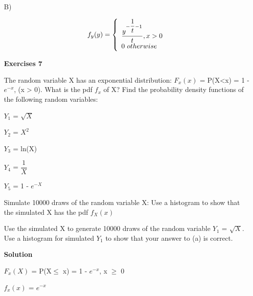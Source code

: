 \documentclass[12pt]{article}
\theoremstyle{definiton}
\theoremstyle{definition}
\theoremstyle{definition}
\let\leq\leqslant
\let\geq\geqslant
\begin{document}
B)
\medskip

\[f_y(y) = \left\{
\begin{array}{l l}
  \dfrac{y^{-\dfrac{1}{t}-1}}{t}, x > 0\\
  0\ otherwise
\end{array} \right.\]
		

		
		\bigskip
		
		\bigskip
		
		\textbf{Exercises 7}		
		\medskip

The random variable X has an exponential distribution:
$F_x(x)$ = P(X<x) = 1 - $e^{-x}$, (x > 0). What is the pdf $f_x$ of X? Find the probability density functions of the following random variables:
\medskip

\begin{list}{) ~}{}
	\item $Y_1$ = $\sqrt{X}$
	\item $Y_2$ = $X^2$
	\item $Y_3$ = ln(X)
	\item $Y_4$ = $\dfrac{1}{X}$
	\item $Y_5$ = 1 - $e^{-X}$
	\item Simulate 10000 draws of the random variable X: Use a histogram to show that the
simulated X has the pdf $f_X(x)$
	\item Use the simulated X to generate 10000 draws of the random variable $Y_1$ = $\sqrt{X}$.
Use a histogram for simulated $Y_1$ to show that your answer to (a) is correct.
\end{list}
		
\textbf{Solution}
\medskip

$F_x(X)$ = P(X$\leq$ x) = 1 - $e^{-x}$,
x $\geq$ 0
\medskip

$f_x(x)$ = $e^{-x}$
\bigskip
\end{document}
